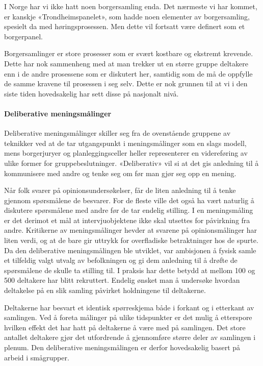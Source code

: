 \documentclass[
  12pt,
  a4paper, 12pt]{article}
\begin{document}
I Norge har vi ikke hatt noen borgersamling enda. Det nærmeste vi har kommet, er kanskje «Trondheimspanelet», som hadde noen elementer av borgersamling, spesielt da med høringsprosessen. Men dette vil fortsatt være definert som et borgerpanel.

Borgersamlinger er store prosesser som er svært kostbare og ekstremt krevende. Dette har nok sammenheng med at man trekker ut en større gruppe deltakere enn i de andre prosessene som er diskutert her, samtidig som de må de oppfylle de samme kravene til prosessen i seg selv. Dette er nok grunnen til at vi i den siste tiden hovedsakelig har sett disse på nasjonalt nivå.

\hypertarget{deliberative-meningsmuxe5linger}{%
\paragraph{Deliberative meningsmålinger}\label{deliberative-meningsmuxe5linger}}

Deliberative meningsmålinger skiller seg fra de ovenstående gruppene av teknikker ved at de tar utgangspunkt i meningsmålinger som en slags modell, mens borgerjuryer og planleggingsceller heller representerer en videreføring av ulike former for gruppebeslutninger. «Deliberativ» vil si at det gis anledning til å kommunisere med andre og tenke seg om før man gjør seg opp en mening.

Når folk svarer på opinionsundersøkelser, får de liten anledning til å tenke gjennom spørsmålene de besvarer. For de fleste ville det også ha vært naturlig å diskutere spørsmålene med andre før de tar endelig stilling. I en meningsmåling er det derimot et mål at intervjuobjektene ikke skal utsettes for påvirkning fra andre. Kritikerne av meningsmålinger hevder at svarene på opinionsmålinger har liten verdi, og at de bare gir uttrykk for overfladiske betraktninger hos de spurte. Da den deliberative meningsmålingen ble utviklet, var ambisjonen å fysisk samle et tilfeldig valgt utvalg av befolkningen og gi dem anledning til å drøfte de spørsmålene de skulle ta stilling til. I praksis har dette betydd at mellom 100 og 500 deltakere har blitt rekruttert. Endelig ønsket man å undersøke hvordan deltakelse på en slik samling påvirket holdningene til deltakerne.

Deltakerne har besvart et identisk spørreskjema både i forkant og i etterkant av samlingen. Ved å foreta målinger på ulike tidspunkter er det mulig å etterspore hvilken effekt det har hatt på deltakerne å være med på samlingen. Det store antallet deltakere gjør det utfordrende å gjennomføre større deler av samlingen i plenum. Den deliberative meningsmålingen er derfor hovedsakelig basert på arbeid i smågrupper.
\end{document}
